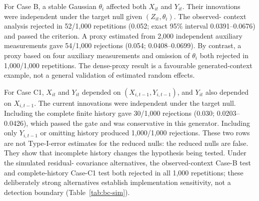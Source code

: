 \documentclass[11pt]{article}
\theoremstyle{definition}
\begin{document}
For Case B, a stable Gaussian $\theta_i$ affected both $X_{it}$ and $Y_{it}$. Their
innovations were independent under the target null given $(Z_{it},\theta_i)$. The observed-
context analysis rejected in 52/1,000 repetitions (0.052; exact 95\% interval
0.0391--0.0676) and passed the criterion. A proxy estimated from 2,000 independent auxiliary
measurements gave 54/1,000 rejections (0.054; 0.0408--0.0699). By contrast, a proxy based on
four auxiliary measurements and omission of $\theta_i$ both rejected in 1,000/1,000
repetitions. The dense-proxy result is a favourable generated-context example, not a general
validation of estimated random effects.

For Case C1, $X_{it}$ and $Y_{it}$ depended on $(X_{i,t-1},Y_{i,t-1})$, and $Y_{it}$ also
depended on $X_{i,t-1}$. The current innovations were independent under the target null.
Including the complete finite history gave 30/1,000 rejections (0.030; 0.0203--0.0426),
which passed the gate and was conservative in this generator. Including only
$Y_{i,t-1}$ or omitting history produced 1,000/1,000 rejections. These two rows are not
Type-I-error estimates for the reduced nulls: the reduced nulls are false. They show that
incomplete history changes the hypothesis being tested. Under the simulated residual-
covariance alternatives, the observed-context Case-B test and complete-history Case-C1 test
both rejected in all 1,000 repetitions; these deliberately strong alternatives establish
implementation sensitivity, not a detection boundary (Table~\ref{tab:bc-sim}).

\begin{table}[!ht]
\centering
\caption{Frozen Case-B and Case-C1 extension. Target-null rows with omitted or incomplete
context diagnose a changed conditioning set and must not be read as calibration estimates
for the corresponding reduced nulls.}
\label{tab:bc-sim}
\end{table}
\end{document}
